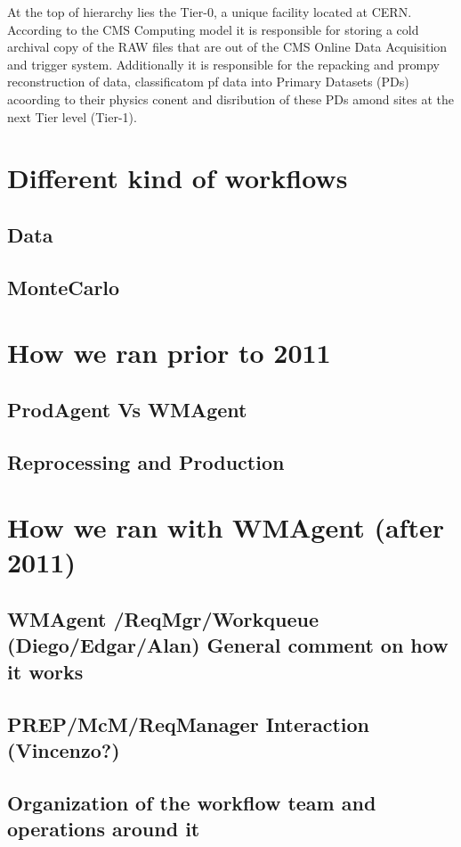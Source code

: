 \documentclass[journal, transmag]{IEEEtran}
\begin{document}
At the top of hierarchy lies the Tier-0, a unique facility located at CERN. According to the CMS Computing model it is responsible for storing a cold archival copy of the RAW files that are out of the CMS Online Data Acquisition and trigger system. Additionally it is responsible for the repacking and prompy reconstruction of data, classificatom pf data into Primary Datasets (PDs) acoording to their physics conent and disribution of these PDs amond sites at the next Tier level (Tier-1).


\section{Different kind of workflows}

\subsection{Data}
\subsection{MonteCarlo}

\section{How we ran prior to 2011}
\subsection{ProdAgent Vs WMAgent}
\subsection{Reprocessing and Production}

\section{How we ran with WMAgent (after 2011)}
\subsection{WMAgent /ReqMgr/Workqueue (Diego/Edgar/Alan) General comment on how it works}
\subsection{PREP/McM/ReqManager Interaction (Vincenzo?)}
\subsection{Organization of the workflow team and operations around it }
\end{document}
